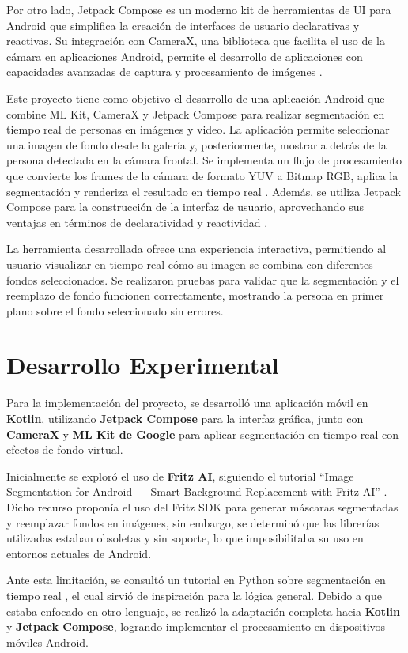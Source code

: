 \documentclass[conference]{IEEEtran}
\begin{document}
    Por otro lado, Jetpack Compose es un moderno kit de herramientas de UI para Android que simplifica la creación de interfaces de usuario declarativas y reactivas. Su integración con CameraX, una biblioteca que facilita el uso de la cámara en aplicaciones Android, permite el desarrollo de aplicaciones con capacidades avanzadas de captura y procesamiento de imágenes \cite{cameraX_docs}.

    Este proyecto tiene como objetivo el desarrollo de una aplicación Android que combine ML Kit, CameraX y Jetpack Compose para realizar segmentación en tiempo real de personas en imágenes y video. La aplicación permite seleccionar una imagen de fondo desde la galería y, posteriormente, mostrarla detrás de la persona detectada en la cámara frontal. Se implementa un flujo de procesamiento que convierte los frames de la cámara de formato YUV a Bitmap RGB, aplica la segmentación y renderiza el resultado en tiempo real \cite{mlkit_selfie_segmentation}. Además, se utiliza Jetpack Compose para la construcción de la interfaz de usuario, aprovechando sus ventajas en términos de declaratividad y reactividad \cite{compose_docs}.

    La herramienta desarrollada ofrece una experiencia interactiva, permitiendo al usuario visualizar en tiempo real cómo su imagen se combina con diferentes fondos seleccionados. Se realizaron pruebas para validar que la segmentación y el reemplazo de fondo funcionen correctamente, mostrando la persona en primer plano sobre el fondo seleccionado sin errores.

 
\section{Desarrollo Experimental} 
Para la implementación del proyecto, se desarrolló una aplicación móvil en \textbf{Kotlin}, utilizando \textbf{Jetpack Compose} para la interfaz gráfica, junto con \textbf{CameraX} y \textbf{ML Kit de Google} para aplicar segmentación en tiempo real con efectos de fondo virtual.  

Inicialmente se exploró el uso de \textbf{Fritz AI}, siguiendo el tutorial ``Image Segmentation for Android — Smart Background Replacement with Fritz AI'' \cite{fritz}. Dicho recurso proponía el uso del Fritz SDK para generar máscaras segmentadas y reemplazar fondos en imágenes, sin embargo, se determinó que las librerías utilizadas estaban obsoletas y sin soporte, lo que imposibilitaba su uso en entornos actuales de Android.  

Ante esta limitación, se consultó un tutorial en Python sobre segmentación en tiempo real \cite{ytseg}, el cual sirvió de inspiración para la lógica general. Debido a que estaba enfocado en otro lenguaje, se realizó la adaptación completa hacia \textbf{Kotlin} y \textbf{Jetpack Compose}, logrando implementar el procesamiento en dispositivos móviles Android.  
\end{document}
